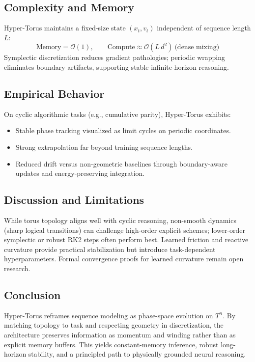 \documentclass{article}
\numberwithin{equation}{section}
\begin{document}
\subsection{Complexity and Memory}
Hyper-Torus maintains a fixed-size state $(x_t,v_t)$ independent of sequence length $L$:
\[
\text{Memory} = \mathcal{O}(1),\qquad
\text{Compute} \approx \mathcal{O}(L\,d^2)\ \text{(dense mixing)}
\]
Symplectic discretization reduces gradient pathologies; periodic wrapping eliminates boundary artifacts, supporting stable infinite-horizon reasoning.

\subsection{Empirical Behavior}
On cyclic algorithmic tasks (e.g., cumulative parity), Hyper-Torus exhibits:
\begin{itemize}
\item Stable phase tracking visualized as limit cycles on periodic coordinates.
\item Strong extrapolation far beyond training sequence lengths.
\item Reduced drift versus non-geometric baselines through boundary-aware updates and energy-preserving integration.
\end{itemize}

\subsection{Discussion and Limitations}
While torus topology aligns well with cyclic reasoning, non-smooth dynamics (sharp logical transitions) can challenge high-order explicit schemes; lower-order symplectic or robust RK2 steps often perform best. Learned friction and reactive curvature provide practical stabilization but introduce task-dependent hyperparameters. Formal convergence proofs for learned curvature remain open research.

\subsection{Conclusion}
Hyper-Torus reframes sequence modeling as phase-space evolution on $T^n$. By matching topology to task and respecting geometry in discretization, the architecture preserves information as momentum and winding rather than as explicit memory buffers. This yields constant-memory inference, robust long-horizon stability, and a principled path to physically grounded neural reasoning.
\end{document}
